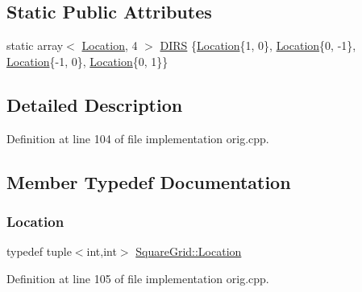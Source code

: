 \subsection*{Static Public Attributes}
\begin{DoxyCompactItemize}
\item 
static array$<$ \hyperlink{struct_square_grid_a2c9a2cbd3912aa48ac97289abc3f1c0f}{Location}, 4 $>$ \hyperlink{struct_square_grid_aac91cba6573640c545485ed054089c87}{D\+I\+RS} \{\hyperlink{struct_square_grid_a2c9a2cbd3912aa48ac97289abc3f1c0f}{Location}\{1, 0\}, \hyperlink{struct_square_grid_a2c9a2cbd3912aa48ac97289abc3f1c0f}{Location}\{0, -\/1\}, \hyperlink{struct_square_grid_a2c9a2cbd3912aa48ac97289abc3f1c0f}{Location}\{-\/1, 0\}, \hyperlink{struct_square_grid_a2c9a2cbd3912aa48ac97289abc3f1c0f}{Location}\{0, 1\}\}
\end{DoxyCompactItemize}


\subsection{Detailed Description}


Definition at line 104 of file implementation orig.\+cpp.



\subsection{Member Typedef Documentation}
\mbox{\label{struct_square_grid_a2c9a2cbd3912aa48ac97289abc3f1c0f}} 
\subsubsection{\texorpdfstring{Location}{Location}\hspace{0.1cm}{\footnotesize\ttfamily [1/2]}}
{\footnotesize\ttfamily typedef tuple$<$int,int$>$ \hyperlink{struct_square_grid_a2c9a2cbd3912aa48ac97289abc3f1c0f}{Square\+Grid\+::\+Location}}



Definition at line 105 of file implementation orig.\+cpp.

\mbox{\label{struct_square_grid_a2c9a2cbd3912aa48ac97289abc3f1c0f}} 
